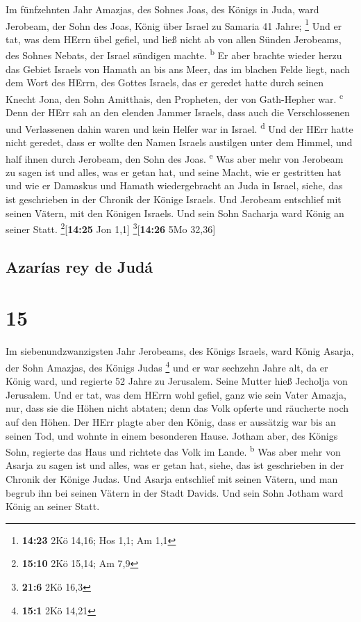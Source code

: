  Im fünfzehnten Jahr Amazjas, des Sohnes Joas, des Königs
in Juda, ward Jerobeam, der Sohn des Joas, König über Israel zu Samaria
41 Jahre; \footnote{\textbf{14:23} 2Kö 14,16; Hos 1,1; Am 1,1}
 Und er tat, was dem HErrn übel gefiel, und ließ nicht ab
von allen Sünden Jerobeams, des Sohnes Nebats, der Israel sündigen
machte. \textsuperscript{b}  Er aber brachte wieder herzu
das Gebiet Israels von Hamath an bis ans Meer, das im blachen Felde
liegt, nach dem Wort des HErrn, des Gottes Israels, das er geredet hatte
durch seinen Knecht Jona, den Sohn Amitthais, den Propheten, der von
Gath-Hepher war. \textsuperscript{c}  Denn der HErr sah
an den elenden Jammer Israels, dass auch die Verschlossenen und
Verlassenen dahin waren und kein Helfer war in Israel.
\textsuperscript{d}  Und der HErr hatte nicht geredet,
dass er wollte den Namen Israels austilgen unter dem Himmel, und half
ihnen durch Jerobeam, den Sohn des Joas. \textsuperscript{e}
 Was aber mehr von Jerobeam zu sagen ist und alles, was
er getan hat, und seine Macht, wie er gestritten hat und wie er Damaskus
und Hamath wiedergebracht an Juda in Israel, siehe, das ist geschrieben
in der Chronik der Könige Israels.  Und Jerobeam
entschlief mit seinen Vätern, mit den Königen Israels. Und sein Sohn
Sacharja ward König an seiner Statt. \footnote{\textbf{15:10} 2Kö 15,14;
  Am 7,9}{[}\textbf{14:25} Jon 1,1{]} \footnote{\textbf{21:6} 2Kö 16,3}{[}\textbf{14:26}
5Mo 32,36{]}

\hypertarget{azaruxedas-rey-de-juduxe1}{%
\subsection{Azarías rey de Judá}\label{azaruxedas-rey-de-juduxe1}}

\hypertarget{section-14}{%
\section{15}\label{section-14}}

 Im siebenundzwanzigsten Jahr Jerobeams, des Königs
Israels, ward König Asarja, der Sohn Amazjas, des Königs Judas
\footnote{\textbf{15:1} 2Kö 14,21}  und er war sechzehn
Jahre alt, da er König ward, und regierte 52 Jahre zu Jerusalem. Seine
Mutter hieß Jecholja von Jerusalem.  Und er tat, was dem
HErrn wohl gefiel, ganz wie sein Vater Amazja,  nur, dass
sie die Höhen nicht abtaten; denn das Volk opferte und räucherte noch
auf den Höhen.  Der HErr plagte aber den König, dass er
aussätzig war bis an seinen Tod, und wohnte in einem besonderen Hause.
Jotham aber, des Königs Sohn, regierte das Haus und richtete das Volk im
Lande. \textsuperscript{b}  Was aber mehr von Asarja zu
sagen ist und alles, was er getan hat, siehe, das ist geschrieben in der
Chronik der Könige Judas.  Und Asarja entschlief mit
seinen Vätern, und man begrub ihn bei seinen Vätern in der Stadt Davids.
Und sein Sohn Jotham ward König an seiner Statt.

